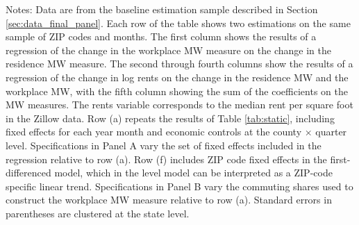 \begin{landscape}
\begin{table}[ht!]
    \begin{minipage}{.95\linewidth} \footnotesize
        \vspace{2mm}
        Notes: 
        Data are from the baseline estimation sample described in Section 
        \ref{sec:data_final_panel}.
        Each row of the table shows two estimations on the same sample of ZIP 
        codes and months.
        The first column shows the results of a regression of the change in the 
        workplace MW measure on the change in the residence MW measure.
        The second through fourth columns show the results of a regression of 
        the change in log rents on the change in the residence MW and the 
        workplace MW, with the fifth column showing the sum of the coefficients 
        on the MW measures.
        The rents variable corresponds to the median rent per square foot in
        the Zillow data.
        Row (a) repeats the results of Table \ref{tab:static}, including fixed
        effects for each year month and economic controls at the 
        county $\times$ quarter level.
        Specifications in Panel A vary the set of fixed effects included in the 
        regression relative to row (a).
        Row (f) includes ZIP code fixed effects in the first-differenced model,
        which in the level model can be interpreted as a ZIP-code specific 
        linear trend.
        Specifications in Panel B vary the commuting shares used to construct 
        the workplace MW measure relative to row (a).
        Standard errors in parentheses are clustered at the state level.
    \end{minipage}
\end{table}
\end{landscape}
